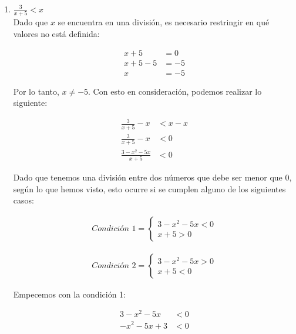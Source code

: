 \documentclass{article}
\begin{document}
\begin{enumerate}
   Para encontrar la intersección de ambos conjuntos de soluciones, tomamos la intersección de los intervalos:
   \[x \in \left(\frac{2}{3}, +\infty\right) \cap \left(-\infty, \frac{16}{7}\right) = \left(\frac{2}{3}, \frac{16}{7}\right)\]
   Por lo tanto, la solución es \(x \in \left(\frac{2}{3}, \frac{16}{7}\right)\)

  
  \item \(\frac{3}{x+5}<x\) \\

Dado que $x$ se encuentra en una división, es necesario restringir en qué valores no está definida:

\[
\begin{aligned}
    x + 5 &= 0 \\
    x + 5 - 5 &= -5 \\
    x &= -5
\end{aligned}
\]

Por lo tanto, $x \neq -5$. Con esto en consideración, podemos realizar lo siguiente:

\[
\begin{aligned}
    \frac{3}{x + 5} - x &< x - x \\
    \frac{3}{x + 5} - x &< 0 \\
    \frac{3 - x^2 - 5x}{x + 5} &< 0
\end{aligned}
\]

Dado que tenemos una división entre dos números que debe ser menor que 0, según lo que hemos visto, esto ocurre si se cumplen alguno de los siguientes casos:

\begin{align*}
\textit{Condición 1} = 
\left\{
\begin{array}{rcl}
{3-x^2-5x<0}\\
x+5>0
\end{array}\right.
\end{align*}

\begin{align*}
\textit{Condición 2} =
\left\{
\begin{array}{rcl}
{3-x^2-5x>0}\\
x+5<0
\end{array}\right.
\end{align*}

Empecemos con la condición 1:

\begin{align*}
    3 - x^2 - 5x &< 0 \\
    -x^2 - 5x + 3 &< 0
\end{align*}


\end{enumerate}
\end{document}
